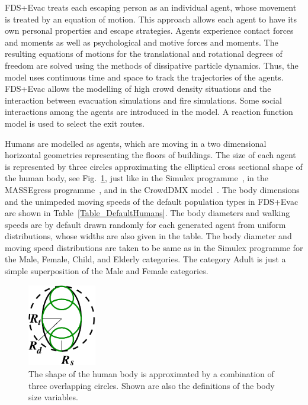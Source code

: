 \documentclass[12pt,a4paper,final,twoside]{stylevk}
\begin{document}
\noindent FDS+Evac treats each escaping person as an individual agent,
whose movement is treated by an equation of motion.  This approach
allows each agent to have its own personal properties and escape
strategies.  Agents experience contact forces and moments as well as
psychological and motive forces and moments.  The resulting equations
of motions for the translational and rotational degrees of freedom are
solved using the methods of dissipative particle dynamics.  Thus, the
model uses continuous time and space to track the trajectories of the
agents.  FDS+Evac allows the modelling of high crowd density
situations and the interaction between evacuation simulations and fire
simulations.  Some social interactions among the agents are introduced
in the model.  A reaction function model is used to select the exit
routes.


Humans are modelled as agents, which are moving in a two dimensional
horizontal geometries representing the floors of buildings.  The size
of each agent is represented by three circles approximating the
elliptical cross sectional shape of the human body, see
Fig.~\ref{Fig_HumanBody}, just like in the Simulex
programme~\cite{Simulex96, Thompson95a, Thompson95b, Thompson03}, in
the MASSEgress programme~\cite{Pan06}, and in the CrowdDMX
model~\cite{Langston06, Langston09}.  The body dimensions and the
unimpeded moving speeds of the default population types in FDS+Evac
are shown in Table~\ref{Table_DefaultHumans}.  The body diameters and
walking speeds are by default drawn randomly for each generated agent
from uniform distributions, whose widths are also given in the table.
The body diameter and moving speed distributions are taken to be same
as in the Simulex programme for the Male, Female, Child, and Elderly
categories.  The category Adult is just a simple superposition of the
Male and Female categories.

%
\begin{figure}[tb]
  \centerline{\includegraphics[clip=true, width=30mm]{FIGURES/body_shape}} 
  \caption{The shape of the human body is approximated by a
    combination of three overlapping circles.  Shown are also the
    definitions of the body size variables.}\label{Fig_HumanBody}
\end{figure}
%
\end{document}
